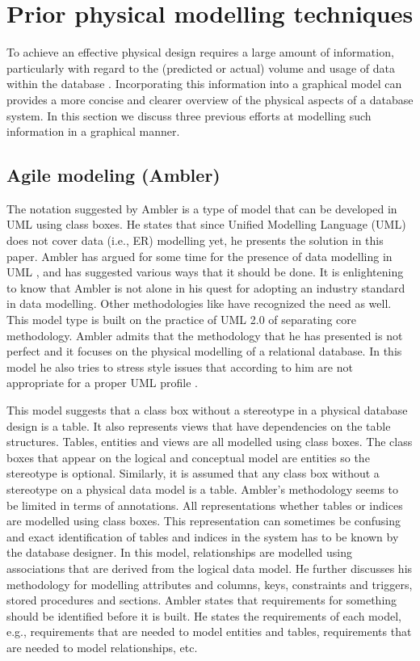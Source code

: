 \documentclass{llncs}
\begin{document}
\section{Prior physical modelling techniques}
\label{sec-previous}

To achieve an effective physical design requires a large amount of information, particularly with regard to the (predicted or actual) volume and usage of data within the database \cite{BeDa-P-2003}. Incorporating this information into a graphical model can provides a more concise and clearer overview of the physical aspects of a database system. In this section we discuss three previous efforts at modelling such information in a graphical manner.


\subsection{Agile modeling (Ambler)}

The notation suggested by Ambler \cite{Ambl-SW-2003-ADT,Ambl-SW-2004-ObjPrimer3} is a type of model that can be developed in UML using class boxes. He states that since Unified Modelling Language (UML) does not cover data (i.e., ER) modelling yet, he presents the solution in this paper. Ambler has argued for some time for the presence of data modelling in UML \cite{Ambl-SW-1998-BOA}, and has suggested various ways that it should be done. It is enlightening to know that Ambler is not alone in his quest for adopting an industry standard in data modelling. Other methodologies like \cite{Naib-EJ-2001-UMLDD} have recognized the need as well. This model type is built on the practice of UML 2.0 of separating core methodology. Ambler admits that the methodology that he has presented is not perfect and it focuses on the physical modelling of a relational database. In this model he also tries to stress style issues that according to him are not appropriate for a proper UML profile \cite{Ambl-SW-2003-ADT}.

This model suggests that a class box without a stereotype in a physical database design is a table. It also represents views that have dependencies on the table structures. Tables, entities and views are all modelled using class boxes. The class boxes that appear on the logical and conceptual model are entities so the stereotype is optional. Similarly, it is assumed that any class box without a stereotype on a physical data model is a table. Ambler's methodology seems to be limited in terms of annotations. All representations whether tables or indices are modelled using class boxes. This representation can sometimes be confusing and exact identification of tables and indices in the system has to be known by the database designer. In this model, relationships are modelled using associations that are derived from the logical data model. He further discusses his methodology for modelling attributes and columns, keys, constraints and triggers, stored procedures and sections. Ambler states that requirements for something should be identified before it is built. He states the requirements of each model, e.g., requirements that are needed to model entities and tables, requirements that are needed to model relationships, etc.
\end{document}
